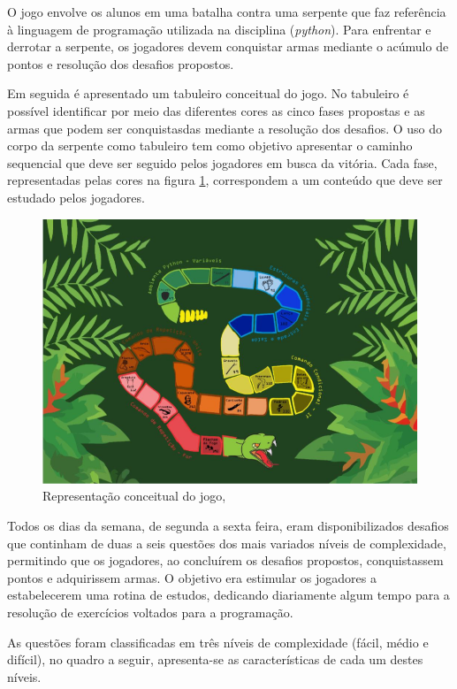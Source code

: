 O jogo envolve os alunos em uma batalha contra uma serpente que faz referência à linguagem de programação utilizada na
disciplina (\textit{python}{\itshape}). Para enfrentar e derrotar a serpente, os jogadores devem conquistar armas mediante o acúmulo
de pontos e resolução dos desafios propostos. 

Em seguida é apresentado um tabuleiro conceitual do jogo. No tabuleiro é possível
identificar por meio das diferentes cores as cinco fases propostas e as armas que podem ser conquistasdas mediante a
resolução dos desafios. O uso do corpo da serpente como tabuleiro tem como objetivo apresentar o caminho sequencial que deve
ser seguido pelos jogadores em busca da vitória. Cada fase, representadas pelas cores na figura \ref{figura1}, correspondem a um conteúdo
que deve ser estudado pelos jogadores.

\begin{figure}[h]
	\centering
	\includegraphics[keepaspectratio=true,scale=0.35]{figuras/desafioSerpente.png}
	\caption{Representação conceitual do jogo, }
	\label{figura1}
\end{figure}

Todos os dias da semana, de segunda a sexta feira, eram disponibilizados desafios que continham de duas a seis
questões dos mais variados níveis de complexidade, permitindo que os jogadores, ao concluírem os desafios propostos, 
conquistassem pontos e adquirissem armas. O objetivo era estimular os jogadores a estabelecerem uma rotina de estudos,
dedicando diariamente algum tempo para a resolução de exercícios voltados para a programação.

As questões foram classificadas em três níveis de complexidade (fácil, médio e difícil), no quadro a seguir, apresenta-se
as características de cada um destes níveis.

